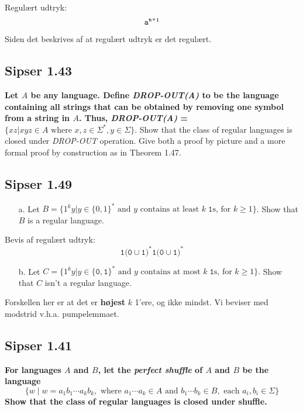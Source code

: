 Regulært udtryk:
\[ \mathtt{a^{n}}^{*}\footnote{Bemærk at det er $(a^{n})^{*}$}\]

Siden det beskrives af at regulært udtryk er det regulært.




\subsection*{Sipser 1.43}%
\label{subsec:sipser1.43}

\textbf{Let $A$ be any language. Define \textit{DROP-OUT(A)} to be the language containing all strings that can be obtained by removing one symbol from a string in $A$. Thus, \textit{DROP-OUT(A)} = $\{xz|xyz\in A \text{ where } x, z \in \Sigma^{*}, y \in \Sigma\}$}. Show that the class of regular languages is closed under \textit{DROP-OUT} operation. Give both a proof by picture and a more formal proof by construction as in Theorem 1.47.


\subsection*{Sipser 1.49}%
\label{subsec:sipser1.49}

\begin{enumerate}
	\item[a.] Let  $B = \{1^{k}y | y \in \{0,1\}^{*} \text{ and } y \text{ contains at least } k \;\mathtt{ 1} \text{s, for } k \ge 1\}$. Show that $B$ is a regular language.
\end{enumerate}

Bevis af regulært udtryk:
\[  \mathtt{1(0} \cup \mathtt{1)}^{*} \mathtt{1(0} \cup \mathtt{1)}^{*} \]

\begin{enumerate}
	\item[b.] Let $C = \{1^{k}y | y \in \{\mathtt{0,1}\}^{*} \text{ and } y \text{ contains at most }k \;\mathtt{1} \text{s, for } k \ge 1\}.$
		Show that $C$ isn't a regular language.
\end{enumerate}

Forskellen her er at det er \textbf{højest} $k$ 1'ere, og ikke mindst.
Vi beviser med modstrid v.h.a. pumpelemmaet.


\subsection*{Sipser 1.41}%
\label{subsec:sipser1.41}
\textbf{For languages $A$ and $B$, let the \textit{perfect shuffle} of $A$ and $B$ be the language}
\[ \{w \; | \; w = a_{1}b_{1} \cdots a_{k}b_{k}, \text{ where } a_{1} \cdots a_{k} \in A \text{ and }b_{1} \cdots b_{k} \in B, \text{ each }a_{i}, b_{i} \in \Sigma\} \]
\textbf{Show that the class of regular languages is closed under shuffle.}

